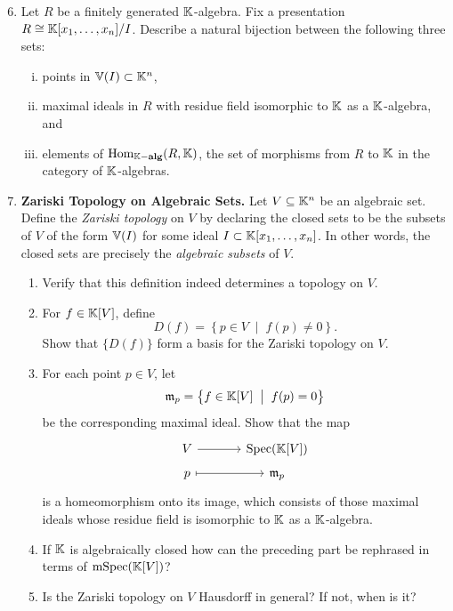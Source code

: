 \documentclass[12pt,reqno]{amsart}
\begin{document}
 \begin{enumerate}[leftmargin=*]
  \setcounter{enumi}{5}
 \item Let $R$ be a finitely generated $\mathbb{K}$-algebra. Fix a presentation $R \cong \mathbb{K}[x_1,\ldots,x_n]/I$. Describe a natural bijection between the following three sets:
 \begin{enumerate}[(i)]
 	\item points in $\mathbb{V}(I) \subset \mathbb{K}^n$, 
	\item maximal ideals in $R$ with residue field isomorphic to $\mathbb{K}$ as a $\mathbb{K}$-algebra, and 
	\item elements of $\operatorname{Hom}_{\mathbb{K}-\operatorname{\textbf{alg}}}(R,\mathbb{K})$, the set of morphisms from $R$ to $\mathbb{K}$ in the category of $\mathbb{K}$-algebras. 
\end{enumerate}

\item \textbf{Zariski Topology on Algebraic Sets.} Let $V \subseteq \mathbb{K}^n$ be an algebraic set. Define the \emph{Zariski topology} on $V$ by declaring the closed sets to be the subsets of $V$ of the form $\mathbb{V}(I)$ for some ideal $I \subset \mathbb{K}[x_1,\ldots,x_n]$. In other words, the closed sets are precisely the \emph{algebraic subsets} of $V$.
\begin{enumerate}[label=(\alph*),ref=\theenumi\alph*]
	\item Verify that this definition indeed determines a topology on $V$.

	\item For $f \in \mathbb{K}[V]$, define
	\[
	D(f) = \left\{p \in V \;\; \big| \;\;  f(p) \neq 0\right \}.
	\]
	Show that $\{D(f)\}$ form a basis for the Zariski topology on $V$.

	\item For each point $p \in V$, let
	\[
	\mathfrak{m}_p = \left\{f \in \mathbb{K}[V] \;\; \big| \;\;  f(p)=0 \right\}
	\]
	be the corresponding maximal ideal. Show that the map
	\[
	\begin{tikzcd}[row sep = .5em, column sep = 3.5em]
	V \arrow[r] & \Spec(\KK[V]) \\
 	p \arrow[r,mapsto] & \fm_p
 	\end{tikzcd}
	\]
	is a homeomorphism onto its image, which consists of those maximal ideals whose residue field is isomorphic to $\mathbb{K}$ as a $\mathbb{K}$-algebra.
	\item If $\mathbb{K}$ is algebraically closed how can the preceding part be rephrased in terms of $\operatorname{mSpec}(\mathbb{K}[V])$?
	\item Is the Zariski topology on $V$ Hausdorff in general? If not, when is it? 
\end{enumerate}
\end{enumerate}
\end{document}
